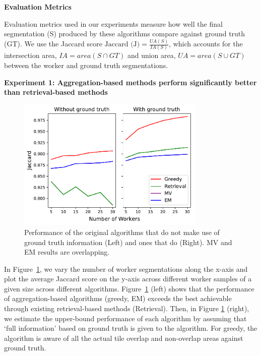 \documentclass[letterpaper]{article}
\newcommand{\agp}[1]{\textcolor{magenta}{Aditya: #1}}
\newcommand{\dor}[1]{\textcolor{blue}{Doris: #1}}
\newcommand{\npar}{\par \noindent}
\newcommand{\stitle}[1]{\noindent \textbf{#1}}
\begin{document}
\stitle{Evaluation Metrics}
\par \noindent Evaluation metrics used in our experiments measure how well the final segmentation (S) produced by these algorithms compare against ground truth (GT). We use the Jaccard score $\text{Jaccard (J)} = \frac{UA(S)}{IA(S)}$, which accounts for the intersection area, $IA=area(S\cap GT)$ and union area, $UA=area(S\cup GT)$ between the worker and ground truth segmentations.

\stitle{Experiment 1: Aggregation-based methods perform significantly better than retrieval-based methods}
\begin{figure}[h!]
   \centering
   \includegraphics[width=0.8\textwidth]{plots/Retrieval_vs_Aggregation.pdf}
   \caption{Performance of the original algorithms that do not make use of ground truth information (Left) and ones that do (Right). MV and EM results are overlapping.} %
   \label{retrieval_vs_aggregation}   
\end{figure} 
\npar In Figure~\ref{retrieval_vs_aggregation}, we vary the number of worker segmentations along the x-axis and plot the average Jaccard score on the y-axis across different worker samples of a given size across different algorithms. Figure~\ref{retrieval_vs_aggregation} (left) shows that the performance of aggregation-based algorithms (greedy, EM) exceeds the best achievable through existing retrieval-based methods (Retrieval). Then, in Figure \ref{retrieval_vs_aggregation} (right), we estimate the upper-bound performance of each algorithm by assuming that `full information' based on ground truth is given to the algorithm. For greedy, the algorithm is aware of all the actual tile overlap and non-overlap areas against ground truth. %
\end{document}
